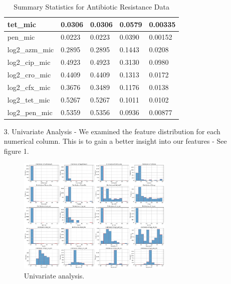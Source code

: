 \documentclass[manuscript,screen,review, nonacm]{acmart}
\begin{document}
\begin{itemize}
\begin{table}[H]
\begin{tabular}{|l|l|l|l|l|}
        tet\_mic              & 0.0306           & 0.0306           & 0.0579           & 0.00335           \\ \hline
        pen\_mic              & 0.0223           & 0.0223           & 0.0390           & 0.00152           \\ \hline
        log2\_azm\_mic        & 0.2895           & 0.2895           & 0.1443           & 0.0208            \\ \hline
        log2\_cip\_mic        & 0.4923           & 0.4923           & 0.3130           & 0.0980            \\ \hline
        log2\_cro\_mic        & 0.4409           & 0.4409           & 0.1313           & 0.0172            \\ \hline
        log2\_cfx\_mic        & 0.3676           & 0.3489           & 0.1176           & 0.0138            \\ \hline
        log2\_tet\_mic        & 0.5267           & 0.5267           & 0.1011           & 0.0102            \\ \hline
        log2\_pen\_mic        & 0.5359           & 0.5356           & 0.0936           & 0.00877           \\ \hline
        \end{tabular}
        \caption{Summary Statistics for Antibiotic Resistance Data}
    \end{table}
    \item[3.] Univariate Analysis - We examined the feature distribution for each numerical column. This is to gain a better insight into our features - See figure 1.
            \begin{figure}[H]
                \centering
                \vspace{-10pt}
                \includegraphics[width=0.7\textwidth]{figures/univar.png}
                \caption{Univariate analysis.}
                \vspace{-10pt}
            \end{figure}


\end{itemize}
\end{document}
